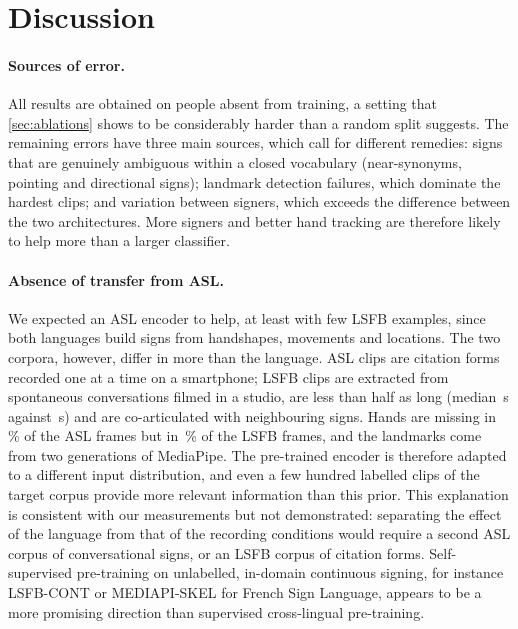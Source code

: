 \section{Discussion}
\label{sec:discussion}

\paragraph{Sources of error.}
All results are obtained on people absent from training, a setting that \cref{sec:ablations} shows
to be considerably harder than a random split suggests. The remaining errors have three main
sources, which call for different remedies: signs that are genuinely ambiguous within a closed
vocabulary (near-synonyms, pointing and directional signs); landmark detection failures, which
dominate the hardest clips; and variation between signers, which exceeds the difference between
the two architectures. More signers and better hand tracking are therefore likely to help more
than a larger classifier.

\paragraph{Absence of transfer from ASL.}
We expected an ASL encoder to help, at least with few LSFB examples, since both languages build
signs from handshapes, movements and locations. The two corpora, however, differ in more than the
language. ASL clips are citation forms recorded one at a time on a smartphone; LSFB clips are
extracted from spontaneous conversations filmed in a studio, are less than half as long (median
\numLsfbDurMedian{}\,s against \numAslDurMedian{}\,s) and are co-articulated with neighbouring signs.
Hands are missing in \numAslNoHandPct{}\,\% of the ASL frames but in \numLsfbNoHandPct{}\,\% of the LSFB
frames, and the landmarks come from two
generations of MediaPipe. The pre-trained encoder is therefore adapted to a different input
distribution, and even a few hundred labelled clips of the target corpus provide more relevant
information than this prior. This explanation is consistent with our measurements but not
demonstrated: separating the effect of the language from that of the recording conditions would
require a second ASL corpus of conversational signs, or an LSFB corpus of citation forms.
Self-supervised pre-training on unlabelled, in-domain continuous signing, for instance LSFB-CONT
\citep{fink2021lsfb} or MEDIAPI-SKEL \citep{bull2020mediapi} for French Sign Language, appears to be
a more promising direction than supervised cross-lingual pre-training.

